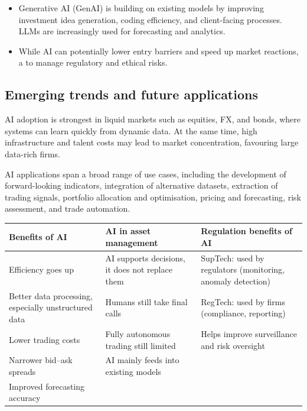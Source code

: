 \begin{itemize}
\item Generative AI (GenAI) is building on existing models by improving investment idea
generation, coding efficiency, and client-facing processes. LLMs are increasingly used for
forecasting and analytics.
\item While AI can potentially lower entry barriers and speed up market reactions, a
 to manage regulatory and ethical risks.
\end{itemize}

\subsection*{Emerging trends and future applications}

AI adoption is strongest in liquid markets such as equities, FX, and bonds, where systems
can learn quickly from dynamic data. At the same time, high infrastructure and talent costs
may lead to market concentration, favouring large data-rich firms.

AI applications span a broad range of use cases, including the development of
forward-looking indicators, integration of alternative datasets, extraction of trading
signals, portfolio allocation and optimisation, pricing and forecasting, risk assessment,
and trade automation.

\begin{cifigblock}
{\centering
\renewcommand{\arraystretch}{1.2}
\begin{tabularx}{\textwidth}{@{}>{\raggedright\arraybackslash}X
                              >{\raggedright\arraybackslash}X
                              >{\raggedright\arraybackslash}X@{}}
\toprule
\rowcolor{PaleGreen}
{\sffamily\bfseries\color{FRMGreen}Benefits of AI} &
{\sffamily\bfseries\color{FRMNavy}AI in asset management} &
{\sffamily\bfseries\color{FRMGold}Regulation benefits of AI}\\
\midrule
Efficiency goes up &
AI supports decisions, it does not replace them &
SupTech: used by regulators (monitoring, anomaly detection)\\
Better data processing, especially unstructured data &
Humans still take final calls &
RegTech: used by firms (compliance, reporting)\\
Lower trading costs &
Fully autonomous trading still limited &
Helps improve surveillance and risk oversight\\
Narrower bid--ask spreads &
AI mainly feeds into existing models & \\
Improved forecasting accuracy & & \\
\bottomrule
\end{tabularx}
\par}
\end{cifigblock}

